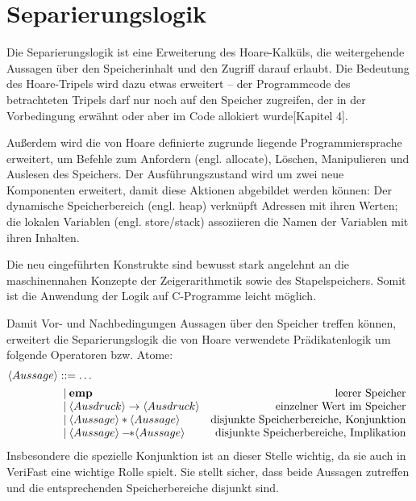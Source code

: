 \section{Separierungslogik}
\label{sec:theorie:seperation-logic}

Die Separierungslogik ist eine Erweiterung des Hoare-Kalküls, die weitergehende Aussagen über den Speicherinhalt
und den Zugriff darauf erlaubt. Die Bedeutung des Hoare-Tripels wird dazu etwas erweitert -- der Programmcode des
betrachteten Tripels darf nur noch auf den Speicher zugreifen, der in der Vorbedingung erwähnt oder aber im Code
allokiert wurde\cite{reynolds-2002}[Kapitel 4].

Außerdem wird die von Hoare definierte zugrunde liegende Programmiersprache erweitert, um Befehle zum Anfordern (engl. allocate), 
Löschen, Manipulieren und Auslesen des Speichers. Der Ausführungszustand wird um zwei neue Komponenten erweitert, damit 
diese Aktionen abgebildet werden können: Der dynamische Speicherbereich (engl. heap) verknüpft Adressen mit ihren
Werten; die lokalen Variablen (engl. store/stack) assoziieren die Namen der Variablen mit ihren Inhalten. 

Die neu eingeführten Konstrukte sind bewusst stark angelehnt an die maschinennahen Konzepte der Zeigerarithmetik sowie des
Stapelspeichers. Somit ist die Anwendung der Logik auf C-Programme leicht möglich.

Damit Vor- und Nachbedingungen Aussagen über den Speicher treffen können, erweitert die Separierungslogik die
von Hoare verwendete Prädikatenlogik um folgende Operatoren bzw. Atome: 
\begin{align*}
\langle Aussage \rangle & ::= \dots \\
& \begin{array}{l r}
  | \: \textbf{emp} & \textrm{leerer Speicher}\\
  | \: \langle Ausdruck \rangle \to \langle Ausdruck \rangle & \textrm{einzelner Wert im Speicher}\\
  | \: \langle Aussage \rangle \ast \langle Aussage \rangle & \textrm{disjunkte Speicherbereiche, Konjunktion}\\
  | \: \langle Aussage \rangle -\!\! \ast \langle Aussage \rangle & \textrm{disjunkte Speicherbereiche, Implikation}\\
\end{array}
\end{align*}
Insbesondere die spezielle Konjunktion ist an dieser Stelle wichtig, da sie auch in \mbox{VeriFast} eine wichtige Rolle spielt.
Sie stellt sicher, dass beide Aussagen zutreffen und die entsprechenden Speicherbereiche disjunkt sind. 

